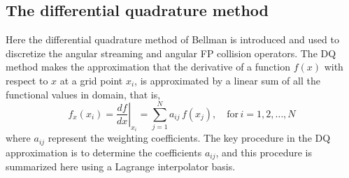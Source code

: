 \subsection{The differential quadrature method}
Here the differential quadrature method of Bellman \cite{Bellman-1972} is introduced and used to discretize the angular streaming and angular FP collision operators. The DQ method makes the approximation that the derivative of a function $f(x)$ with respect to $x$ at a grid point $x_i$, is approximated by a linear sum of all the functional values in domain, that is,
\begin{equation}
    f_x(x_i) = \left.\dfrac{df}{dx}\right|_{x_i} = \sum_{j=1}^N a_{ij} \, f(x_j), \quad \text{for} \, i=1,2,\ldots,N
\end{equation} 
where $a_{ij}$ represent the weighting coefficients. The key procedure in the DQ approximation is to determine the coefficients $a_{ij}$, and this procedure is summarized here using a Lagrange interpolator basis. 

